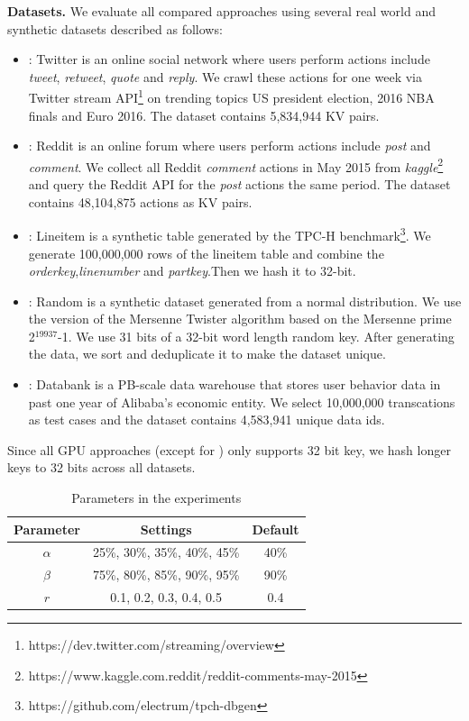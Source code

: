 \vspace{1mm}\noindent\textbf{Datasets.} We evaluate all compared approaches using several real world and synthetic datasets described as follows:
\begin{itemize}
	\item \dstwitter: Twitter is an online social network where users perform actions include \emph{tweet}, \emph{retweet}, \emph{quote} and \emph{reply}.
	We crawl these actions for one week via Twitter stream API\footnote{https://dev.twitter.com/streaming/overview} on trending topics US president election, 2016 NBA finals and Euro 2016. The dataset contains 5,834,944 KV pairs.
	\item \dsreddit: Reddit is an online forum where users perform actions include \emph{post} and \emph{comment}. We collect all Reddit \emph{comment} actions in May 2015 from \emph{kaggle}\footnote{https://www.kaggle.com.reddit/reddit-comments-may-2015} and query the Reddit API for the \emph{post} actions the same period. The dataset contains 48,104,875 actions as KV pairs. 
 	\item \dstpch: Lineitem is a synthetic table generated by the TPC-H benchmark\footnote{https://github.com/electrum/tpch-dbgen}. We generate  100,000,000 rows of the lineitem table and combine the \emph{orderkey},\emph{linenumber} and \emph{partkey}.Then we hash it to 32-bit.
	\item \dsrandom: Random is a synthetic dataset generated from a normal distribution. We use the version of the Mersenne Twister algorithm based on the Mersenne prime 2$^{19937}$-1. We use 31 bits of a 32-bit word length random key. After generating the data, we sort and deduplicate it to make the dataset unique. 
	\item \dsali: Databank is a PB-scale data warehouse that stores user behavior data in past one year of Alibaba's economic entity. We select  10,000,000 transcations as test cases and the dataset contains 4,583,941 unique data ids.
\end{itemize}
Since all GPU approaches (except for \voter) only supports 32 bit key, we hash longer keys to 32 bits across all datasets. 


\begin{table}
	\centering
	\caption{Parameters in the experiments}
	\label{tbl:parameters}
	\begin{tabular}{|c|c|c|}
		\hline
		\textbf{Parameter} & \textbf{Settings} & \textbf{Default} \\ \hline
		$\alpha$ & 25\%, 30\%, 35\%, 40\%, 45\% & 40\% \\ \hline
		$\beta$  & 75\%, 80\%, 85\%, 90\%, 95\% & 90\% \\ \hline
		$r$ & 0.1, 0.2, 0.3, 0.4, 0.5 & 0.4 \\ \hline
	\end{tabular}
\end{table}

